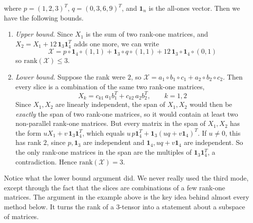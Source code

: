 \begin{example}
\begin{equation}
    \end{equation}
    where $p = (1, 2, 3)^T$, $q = (0, 3, 6, 9)^T$, and $\mathbf{1}_n$ is the all-ones vector. Then we have the following bounds. 
    \begin{enumerate}
      \item \textit{Upper bound.} Since $X_1$ is the sum of two rank-one matrices, and $X_2 = X_1 + 12 \, \mathbf{1}_3 \mathbf{1}_4^T$ adds one more, we can write
      \begin{equation}
        \mathcal{X} = p \circ \mathbf{1}_4 \circ (1, 1) + \mathbf{1}_3 \circ q \circ (1, 1) + 12 \, \mathbf{1}_3 \circ \mathbf{1}_4 \circ (0, 1)
      \end{equation}
      so $\mathrm{rank}(\mathcal{X}) \leq 3$.

      \item \textit{Lower bound.} Suppose the rank were $2$, so $\mathcal{X} = a_1 \circ b_1 \circ c_1 + a_2 \circ b_2 \circ c_2$. Then every slice is a combination of the same two rank-one matrices,
      \begin{equation}
        X_k = c_{k1} \, a_1 b_1^T + c_{k2} \, a_2 b_2^T, \qquad k = 1, 2
      \end{equation}
      Since $X_1, X_2$ are linearly independent, the span of $X_1, X_2$ would then be \textit{exactly} the span of two rank-one matrices, so it would contain at least two non-parallel rank-one matrices. But every matrix in the span of $X_1, X_2$ has the form $u X_1 + v \, \mathbf{1}_3 \mathbf{1}_4^T$, which equals $u \, p \mathbf{1}_4^T + \mathbf{1}_3 (u q + v \mathbf{1}_4)^T$. If $u \neq 0$, this has rank $2$, since $p, \mathbf{1}_3$ are independent and $\mathbf{1}_4, uq + v\mathbf{1}_4$ are independent. So the only rank-one matrices in the span are the multiples of $\mathbf{1}_3 \mathbf{1}_4^T$, a contradiction. Hence $\mathrm{rank}(\mathcal{X}) = 3$.
    \end{enumerate}
  \end{example}

  Notice what the lower bound argument did. We never really used the third mode, except through the fact that the slices are combinations of a few rank-one matrices. The argument in the example above is the key idea behind almost every method below. It turns the rank of a $3$-tensor into a statement about a subspace of matrices.

